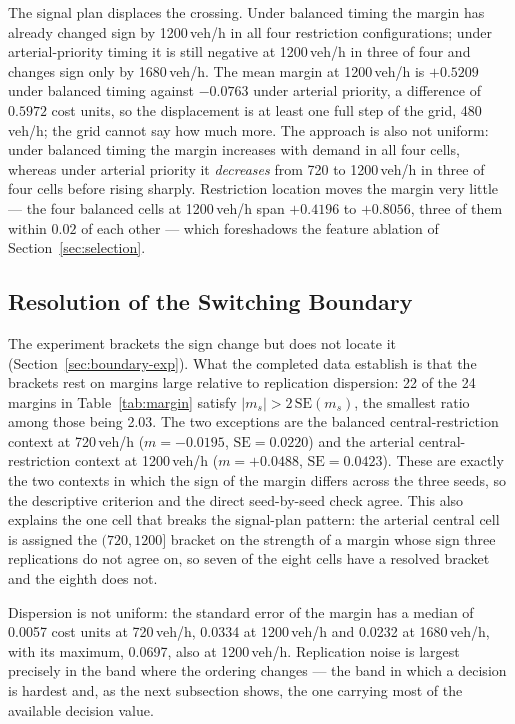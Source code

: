 \documentclass[runningheads]{llncs}
\begin{document}
The signal plan displaces the crossing. Under balanced timing the margin has already
changed sign by 1200\,veh/h in all four restriction configurations; under
arterial-priority timing it is still negative at 1200\,veh/h in three of four and changes
sign only by 1680\,veh/h. The mean margin at 1200\,veh/h is $+0.5209$ under balanced
timing against $-0.0763$ under arterial priority, a difference of $0.5972$ cost units, so
the displacement is at least one full step of the grid, 480\,veh/h; the grid cannot say
how much more. The approach is also not uniform: under balanced timing the margin
increases with demand in all four cells, whereas under arterial priority it
\emph{decreases} from 720 to 1200\,veh/h in three of four cells before rising sharply.
Restriction location moves the margin very little --- the four balanced cells at
1200\,veh/h span $+0.4196$ to $+0.8056$, three of them within $0.02$ of each other ---
which foreshadows the feature ablation of Section~\ref{sec:selection}.

\subsection{Resolution of the Switching Boundary}
\label{sec:noise}

The experiment brackets the sign change but does not locate it
(Section~\ref{sec:boundary-exp}). What the completed data establish is that the brackets
rest on margins large relative to replication dispersion: 22 of the 24 margins in
Table~\ref{tab:margin} satisfy $|m_s|>2\,\mathrm{SE}(m_s)$, the smallest ratio among
those being 2.03. The two exceptions are the balanced central-restriction context at
720\,veh/h ($m=-0.0195$, $\mathrm{SE}=0.0220$) and the arterial central-restriction
context at 1200\,veh/h ($m=+0.0488$, $\mathrm{SE}=0.0423$). These are exactly the two
contexts in which the sign of the margin differs across the three seeds, so the
descriptive criterion and the direct seed-by-seed check agree. This also explains the one
cell that breaks the signal-plan pattern: the arterial central cell is assigned the
$(720,1200]$ bracket on the strength of a margin whose sign three replications do not
agree on, so seven of the eight cells have a resolved bracket and the eighth does not.

Dispersion is not uniform: the standard error of the margin has a median of 0.0057 cost
units at 720\,veh/h, 0.0334 at 1200\,veh/h and 0.0232 at 1680\,veh/h, with its maximum,
0.0697, also at 1200\,veh/h. Replication noise is largest precisely in the band where the
ordering changes --- the band in which a decision is hardest and, as the next subsection
shows, the one carrying most of the available decision value.
\end{document}

